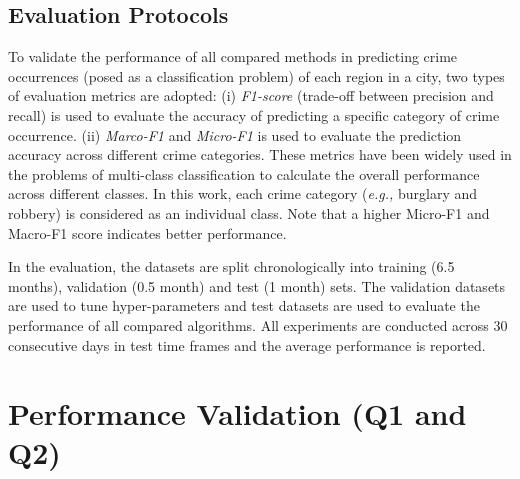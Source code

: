 \subsection{Evaluation Protocols}

To validate the performance of all
compared methods in predicting crime occurrences (posed as a
classification problem) of each region in a city, two types of
evaluation metrics are adopted: (i) \emph{F1-score} (trade-off between precision
and recall) is used to evaluate the accuracy of predicting a specific category
of crime occurrence. (ii) \emph{Marco-F1} and \emph{Micro-F1} is used to
evaluate the prediction accuracy across different crime categories.
These metrics have been widely used in the problems of multi-class
classification to calculate the overall performance across different
classes. In this work, each crime category (\emph{e.g.,} burglary
and robbery) is considered as an individual class. Note that a higher Micro-F1
and Macro-F1 score indicates better performance.

\noindent In the evaluation, the datasets are split chronologically into
training (6.5 months), validation (0.5 month) and test (1 month)
sets. The validation datasets are used to tune hyper-parameters and
test datasets are used to evaluate the performance of all compared algorithms. All experiments are conducted across 30 consecutive
days in test time frames and the average performance is reported.

\section{Performance Validation (Q1 and Q2)}

